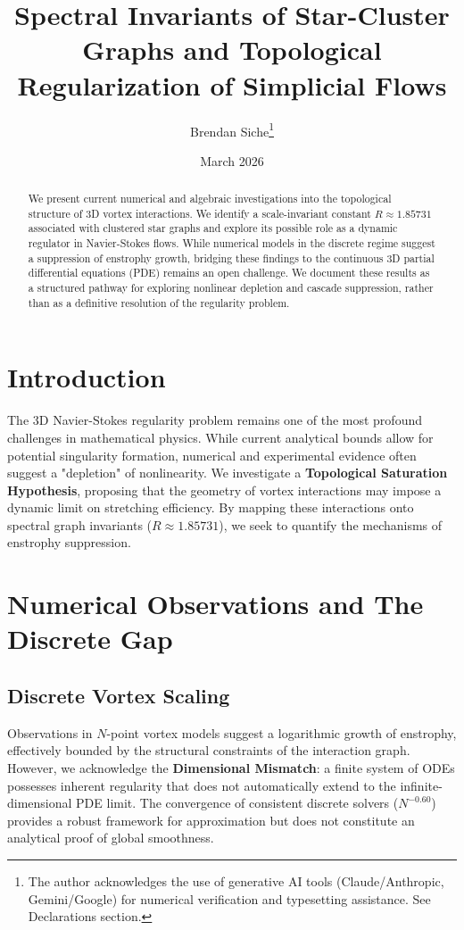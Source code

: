 \documentclass[11pt,a4paper]{article}
\title{\textbf{Spectral Invariants of Star-Cluster Graphs and Topological Regularization of Simplicial Flows}}
\author{Brendan Siche\thanks{The author acknowledges the use of generative AI tools (Claude/Anthropic, Gemini/Google) for numerical verification and typesetting assistance. See Declarations section.}}
\date{March 2026}
\begin{document}
\maketitle

\begin{abstract}
We present current numerical and algebraic investigations into the topological structure of 3D vortex interactions. We identify a scale-invariant constant $R \approx 1.85731$ associated with clustered star graphs and explore its possible role as a dynamic regulator in Navier-Stokes flows. While numerical models in the discrete regime suggest a suppression of enstrophy growth, bridging these findings to the continuous 3D partial differential equations (PDE) remains an open challenge. We document these results as a structured pathway for exploring nonlinear depletion and cascade suppression, rather than as a definitive resolution of the regularity problem.
\end{abstract}

\section{Introduction}
The 3D Navier-Stokes regularity problem remains one of the most profound challenges in mathematical physics. While current analytical bounds allow for potential singularity formation, numerical and experimental evidence often suggest a "depletion" of nonlinearity. We investigate a \textbf{Topological Saturation Hypothesis}, proposing that the geometry of vortex interactions may impose a dynamic limit on stretching efficiency. By mapping these interactions onto spectral graph invariants ($R \approx 1.85731$), we seek to quantify the mechanisms of enstrophy suppression.

\section{Numerical Observations and The Discrete Gap}

\subsection{Discrete Vortex Scaling}
Observations in $N$-point vortex models suggest a logarithmic growth of enstrophy, effectively bounded by the structural constraints of the interaction graph. However, we acknowledge the \textbf{Dimensional Mismatch}: a finite system of ODEs possesses inherent regularity that does not automatically extend to the infinite-dimensional PDE limit. The convergence of consistent discrete solvers ($N^{-0.60}$) provides a robust framework for approximation but does not constitute an analytical proof of global smoothness.
\end{document}
